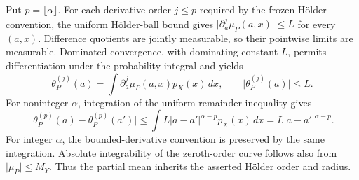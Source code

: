 Put \(p=\lfloor\alpha\rfloor\). For each derivative order \(j\le p\) required by the frozen Hölder convention, the uniform Hölder-ball bound gives \(\lvert\partial_a^j\mu_P(a,x)\rvert\le L\) for every \((a,x)\). Difference quotients are jointly measurable, so their pointwise limits are measurable. Dominated convergence, with dominating constant \(L\), permits differentiation under the probability integral and yields
\[
\theta_P^{(j)}(a)=\int\partial_a^j\mu_P(a,x)p_X(x)\,dx,
\qquad \lvert\theta_P^{(j)}(a)\rvert\le L.
\]
For noninteger \(\alpha\), integration of the uniform remainder inequality gives
\[
\lvert\theta_P^{(p)}(a)-\theta_P^{(p)}(a')\rvert
\le\int L\lvert a-a'\rvert^{\alpha-p}p_X(x)\,dx
=L\lvert a-a'\rvert^{\alpha-p}.
\]
For integer \(\alpha\), the bounded-derivative convention is preserved by the same integration. Absolute integrability of the zeroth-order curve follows also from \(\lvert\mu_P\rvert\le M_Y\). Thus the partial mean inherits the asserted Hölder order and radius.